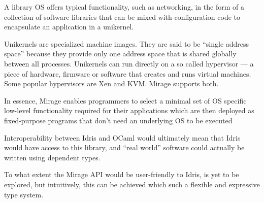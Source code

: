 A library OS offers typical functionality, such as networking,
in the form of a collection of software libraries that can be
mixed with configuration code to encapsulate an application
in a unikernel.

Unikernels are specialized machine images.
They are said to be ``single address space'' because they provide
only one address space that is shared globally between all processes.
Unikernels can run directly on a so called hypervisor ---
a piece of hardware, firmware or software
that creates and runs virtual machines.
Some popular hypervisors are Xen and KVM. Mirage supports
both.

In essence, Mirage enables programmers to select a minimal set of OS specific
low-level functionality required for their applications which are then deployed
as fixed-purpose programs that don't need an underlying OS to be executed

Interoperability between Idris and OCaml would ultimately mean
that Idris would have access to this library, and ``real world''
software could actually be written using dependent types.

To what extent the Mirage API would be user-friendly to Idris,
is yet to be explored, but intuitively, this can be achieved
which such a flexible and expressive type system.